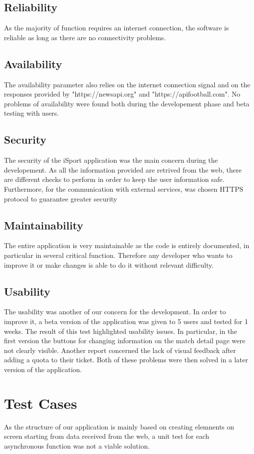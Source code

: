 \documentclass[numbers=noenddot, 12pt, a4paper, oneside]{scrbook}
\begin{document}
\section{Reliability}
As the majority of function requires an internet connection, the software is reliable as long as there are no connectivity problems.
\section{Availability}
The availability parameter also relies on the internet connection signal and on the responses provided by "https://newsapi.org" and "https://apifootball.com". No problems of availability were found both during the developement phase and beta testing with users.
\section{Security}
The security of the iSport application was the main concern during the developement. As all the information provided are retrived from the web, there are different checks to perform in order to keep the user information safe. Furthermore, for the communication with external services, was chosen HTTPS protocol to guarantee greater security
\section{Maintainability}
The entire application is very maintainable as the code is entirely documented, in particular in several critical function. Therefore any developer who wants to improve it or make changes is able to do it without relevant difficulty.
\section{Usability}
The usability was another of our concern for the development. In order to improve it, a beta version of the application was given to 5 users and tested for 1 weeks. The result of this test highlighted usability issues. In particular, in the first version the buttons for changing information on the match detail page were not clearly visible. Another report concerned the lack of visual feedback after adding a quota to their ticket. Both of these problems were then solved in a later version of the application.

\chapter{Test Cases}
As the structure of our application is mainly based on creating elemnents on screen starting from data received from the web, a unit test for each asynchronous function was not a viable solution.\\
\end{document}
